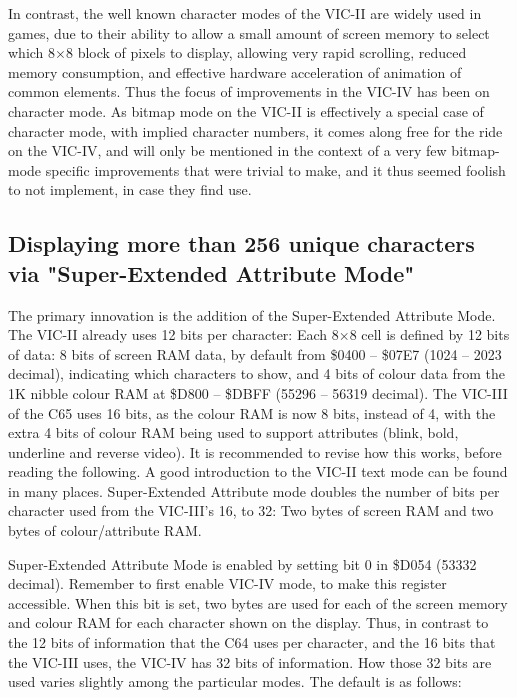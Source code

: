 \begin{enumerate}
In contrast, the well known character modes of the VIC-II are widely used in games, due to their ability to allow a small amount
of screen memory to select which 8$\times$8 block of pixels to display, allowing very rapid scrolling, reduced memory consumption, and
effective hardware acceleration of animation of common elements.  Thus the focus of improvements in the VIC-IV has been on
character mode.  As bitmap mode on the VIC-II is effectively a special case of character mode, with implied character numbers, it
comes along free for the ride on the VIC-IV, and will only be mentioned in the context of a very few bitmap-mode specific
improvements that were trivial to make, and it thus seemed foolish to not implement, in case they find use.

\end{enumerate}

\subsection{Displaying more than 256 unique characters via
"Super-Extended Attribute Mode"}

The primary innovation is the addition of the Super-Extended Attribute Mode. The VIC-II already uses 12 bits per character: Each 8$\times$8
cell is defined by 12 bits of data: 8 bits of screen RAM data, by
default from \$0400 -- \$07E7 (1024 -- 2023 decimal), indicating which
characters to show, and 4 bits of colour data from the 1K nibble colour
RAM at \$D800 -- \$DBFF (55296 -- 56319 decimal). The VIC-III of the
C65 uses 16 bits, as the colour RAM is now 8 bits, instead of 4, with
the extra 4 bits of colour RAM being used to support attributes (blink,
bold, underline and reverse video).  It is recommended to revise how
this works, before reading the following. A good introduction to the
VIC-II text mode can be found in many places.
Super-Extended Attribute mode doubles the number of bits per character used from the VIC-III’s 16, to 32: Two bytes of screen RAM and two bytes of
colour/attribute RAM.

Super-Extended Attribute Mode is enabled by setting bit 0 in \$D054
(53332 decimal). Remember to first enable VIC-IV mode, to make this
register accessible. When this bit is set, two bytes are used for each
of the screen memory and colour RAM for each character shown on the
display. Thus, in contrast to the 12 bits of information that the C64
uses per character, and the 16 bits that the VIC-III uses, the VIC-IV
has 32 bits of information.  How those 32 bits are used varies slightly
among the particular modes.  The default is as follows:

